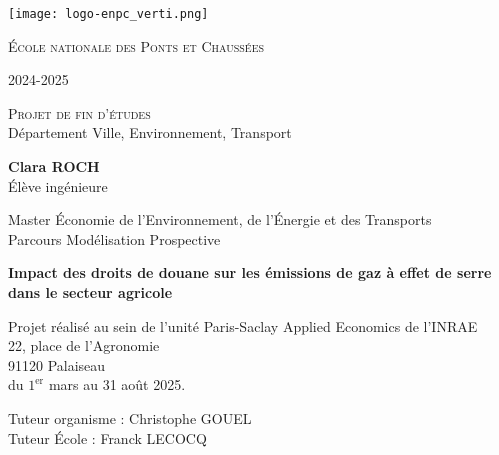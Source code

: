 \begin{titlepage}
    \vspace*{-2.5cm}
    \begin{center}
        \texttt{[image: logo-enpc\_verti.png]}\par
        {\LARGE \textsc{École nationale des Ponts et Chaussées}\par}

        2024-2025

        \vspace{0.5cm}
        {\Large \textsc{Projet de fin d’études}} \\
        Département Ville, Environnement, Transport

        \vspace{0.5cm}
        {\large \textbf{Clara ROCH}} \\
        Élève ingénieure

        Master Économie de l’Environnement, de l’Énergie et des Transports \\
        Parcours Modélisation Prospective

        \vspace{0.5cm}
        {\LARGE \bfseries {Impact des droits de douane sur les émissions de gaz à effet de serre dans le secteur agricole} \par}

        \vspace{1cm}
        Projet réalisé au sein de l'unité Paris-Saclay Applied Economics de l'INRAE \\
        22, place de l'Agronomie \\
        91120 Palaiseau \\
        du $1^{\text{er}}$ mars au 31 août 2025.

        \vspace{1cm}
        {\large Tuteur organisme : Christophe GOUEL \\
            Tuteur École : Franck LECOCQ}

    \end{center}
\end{titlepage}
